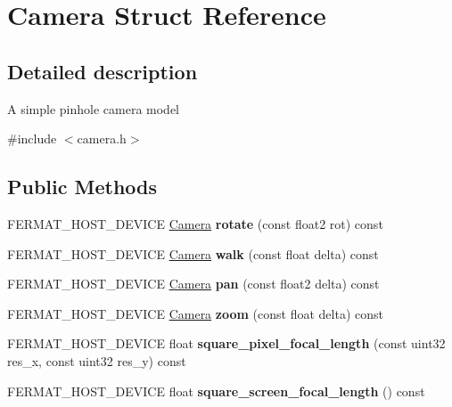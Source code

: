 \hypertarget{struct_camera}{}\section{Camera Struct Reference}
\label{struct_camera}


\subsection{Detailed description}
A simple pinhole camera model 

{\ttfamily \#include $<$camera.\+h$>$}

\subsection*{Public Methods}
\begin{DoxyCompactItemize}
\item 
\mbox{\label{struct_camera_a2c492aca90a8a4c011ea3fbb81da07eb}} 
F\+E\+R\+M\+A\+T\+\_\+\+H\+O\+S\+T\+\_\+\+D\+E\+V\+I\+CE \hyperlink{struct_camera}{Camera} {\bfseries rotate} (const float2 rot) const
\item 
\mbox{\label{struct_camera_a67c1e2e95fdf31adc114ecd1e6c83298}} 
F\+E\+R\+M\+A\+T\+\_\+\+H\+O\+S\+T\+\_\+\+D\+E\+V\+I\+CE \hyperlink{struct_camera}{Camera} {\bfseries walk} (const float delta) const
\item 
\mbox{\label{struct_camera_abc036f653e1f2c8810f7ccdf44b05f76}} 
F\+E\+R\+M\+A\+T\+\_\+\+H\+O\+S\+T\+\_\+\+D\+E\+V\+I\+CE \hyperlink{struct_camera}{Camera} {\bfseries pan} (const float2 delta) const
\item 
\mbox{\label{struct_camera_a10fea162ffafa1b9b58213c3b58cba91}} 
F\+E\+R\+M\+A\+T\+\_\+\+H\+O\+S\+T\+\_\+\+D\+E\+V\+I\+CE \hyperlink{struct_camera}{Camera} {\bfseries zoom} (const float delta) const
\item 
\mbox{\label{struct_camera_a3d6e3421c6a48fd29b5d8a1462c40ec4}} 
F\+E\+R\+M\+A\+T\+\_\+\+H\+O\+S\+T\+\_\+\+D\+E\+V\+I\+CE float {\bfseries square\+\_\+pixel\+\_\+focal\+\_\+length} (const uint32 res\+\_\+x, const uint32 res\+\_\+y) const
\item 
\mbox{\label{struct_camera_ad321b3e08095707d67438c9588f43e8d}} 
F\+E\+R\+M\+A\+T\+\_\+\+H\+O\+S\+T\+\_\+\+D\+E\+V\+I\+CE float {\bfseries square\+\_\+screen\+\_\+focal\+\_\+length} () const
\end{DoxyCompactItemize}
